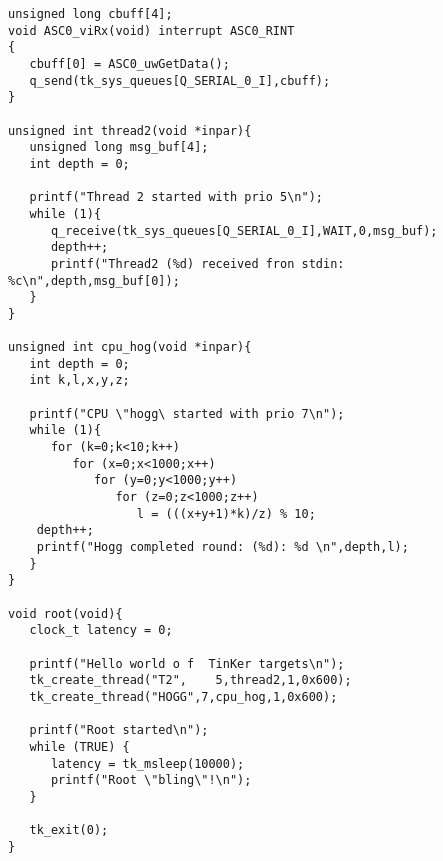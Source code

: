 \begin{table}[!hbp]
\begin{verbatim}
unsigned long cbuff[4];
void ASC0_viRx(void) interrupt ASC0_RINT
{
   cbuff[0] = ASC0_uwGetData();
   q_send(tk_sys_queues[Q_SERIAL_0_I],cbuff);
}

unsigned int thread2(void *inpar){
   unsigned long msg_buf[4];
   int depth = 0;

   printf("Thread 2 started with prio 5\n");
   while (1){
      q_receive(tk_sys_queues[Q_SERIAL_0_I],WAIT,0,msg_buf);
      depth++;
      printf("Thread2 (%d) received fron stdin: %c\n",depth,msg_buf[0]);
   }
}

unsigned int cpu_hog(void *inpar){
   int depth = 0;
   int k,l,x,y,z;

   printf("CPU \"hogg\ started with prio 7\n");
   while (1){
      for (k=0;k<10;k++)
         for (x=0;x<1000;x++)
            for (y=0;y<1000;y++)
               for (z=0;z<1000;z++)
                  l = (((x+y+1)*k)/z) % 10;
    depth++;
    printf("Hogg completed round: (%d): %d \n",depth,l);
   }
}

void root(void){
   clock_t latency = 0;

   printf("Hello world o f  TinKer targets\n");
   tk_create_thread("T2",    5,thread2,1,0x600);
   tk_create_thread("HOGG",7,cpu_hog,1,0x600);

   printf("Root started\n");
   while (TRUE) {
      latency = tk_msleep(10000);
      printf("Root \"bling\"!\n");
   }

   tk_exit(0);
}
\end{verbatim}
\caption{Events determined by interrupts.\label{isr}}
\end{table}

